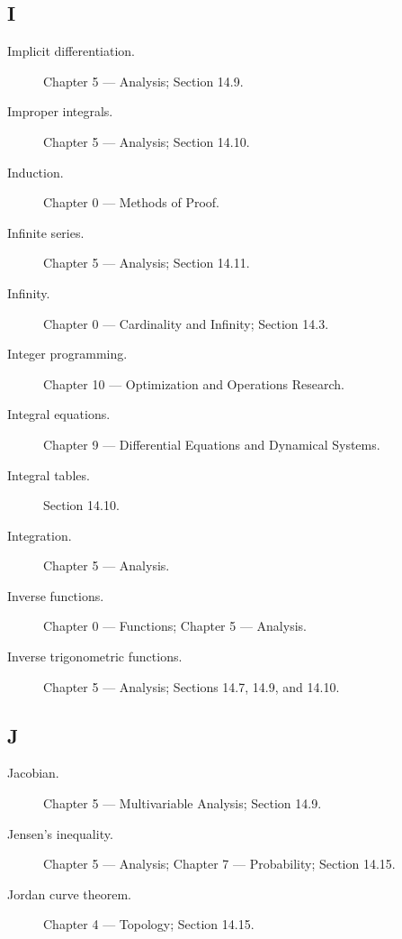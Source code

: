 \subsection*{I}

\begin{description}

\item[Implicit differentiation.]
Chapter 5 --- Analysis;
Section 14.9.

\item[Improper integrals.]
Chapter 5 --- Analysis;
Section 14.10.

\item[Induction.]
Chapter 0 --- Methods of Proof.

\item[Infinite series.]
Chapter 5 --- Analysis;
Section 14.11.

\item[Infinity.]
Chapter 0 --- Cardinality and Infinity;
Section 14.3.

\item[Integer programming.]
Chapter 10 --- Optimization and Operations Research.

\item[Integral equations.]
Chapter 9 --- Differential Equations and Dynamical Systems.

\item[Integral tables.]
Section 14.10.

\item[Integration.]
Chapter 5 --- Analysis.

\item[Inverse functions.]
Chapter 0 --- Functions;
Chapter 5 --- Analysis.

\item[Inverse trigonometric functions.]
Chapter 5 --- Analysis;
Sections 14.7, 14.9, and 14.10.

\end{description}

\subsection*{J}

\begin{description}

\item[Jacobian.]
Chapter 5 --- Multivariable Analysis;
Section 14.9.

\item[Jensen's inequality.]
Chapter 5 --- Analysis;
Chapter 7 --- Probability;
Section 14.15.

\item[Jordan curve theorem.]
Chapter 4 --- Topology;
Section 14.15.

\end{description}

